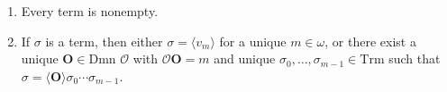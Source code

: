\begin{enumerate}
\item[(i)] Every term is nonempty.
\item[(ii)] If $\sigma$ is a term, then either $\sigma = \langle v_m \rangle$ for a unique $m \in \omega$, or there exist a unique $\mathbf{O} \in \text{Dmn } \mathcal{O}$ with $\mathcal{O}\mathbf{O} = m$ and unique $\sigma_0, \ldots, \sigma_{m-1} \in \text{Trm}$ such that $\sigma = \langle \mathbf{O} \rangle \sigma_0 \cdots \sigma_{m-1}$.
\end{enumerate}
